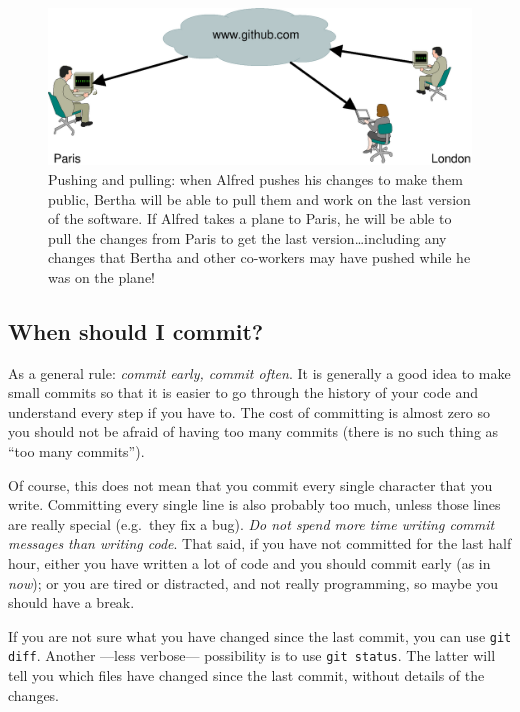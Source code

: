 \begin{figure}[htbp!]
  \centering
  \includegraphics[width=\textwidth]{gfx/pushpull}
  \caption{Pushing and pulling: when Alfred pushes his changes to make
    them public, Bertha will be able to pull them and work on the last
    version of the software. If Alfred takes a plane to Paris, he will
    be able to pull the changes from Paris to get the last
    version\ldots including any changes that Bertha and other
    co-workers may have pushed while he was on the plane!}
  \label{fig:pushpull}
\end{figure}

\subsection{When should I commit?}
\label{sec:when-should-i}

As a general rule: \emph{commit early, commit often}. It is generally
a good idea to make small commits so that it is easier to go through
the history of your code and understand every step if you have to. The
cost of 
committing is almost zero so you should not be afraid of having too
many commits (there is no such thing as ``too many commits''). 

Of course, this does not mean that you commit every single character
that you write. Committing every single line is also probably too
much, unless those lines are really special (e.g.~they fix a bug). 
\emph{Do not spend more time
writing commit messages than writing code}. That said, if you have not
committed for the last half hour, either you have written a lot of
code and you should commit early (as in \emph{now}); or you are tired
or distracted, and not really programming, so maybe you should have a
break.

If you are not sure what you have changed since the last commit, 
you can use \verb+git diff+. Another ---less verbose--- possibility
is to use \verb+git status+. The latter will tell you
which files have changed since the last commit, without details of the
changes.

